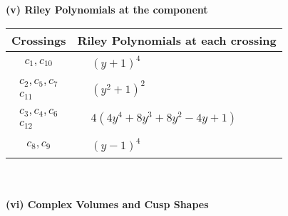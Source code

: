 \documentclass[1p]{elsarticle_modified}
\theoremstyle{definition}
\begin{document}
\newpage\renewcommand{\arraystretch}{1}
\flushleft \textbf{(v) Riley Polynomials at the component}\newline \\
\begin{tabular}{m{50pt}|m{274pt}}
Crossings & \hspace{64pt}Riley Polynomials at each crossing \\
\hline $$\begin{aligned}c_{1},c_{10}\end{aligned}$$&$\begin{aligned}
&(y+1)^4
\end{aligned}$\\
\hline $$\begin{aligned}c_{2},c_{5},c_{7}\\c_{11}\end{aligned}$$&$\begin{aligned}
&(y^2+1)^2
\end{aligned}$\\
\hline $$\begin{aligned}c_{3},c_{4},c_{6}\\c_{12}\end{aligned}$$&$\begin{aligned}
&4(4 y^4+8 y^3+8 y^2-4 y+1)
\end{aligned}$\\
\hline $$\begin{aligned}c_{8},c_{9}\end{aligned}$$&$\begin{aligned}
&(y-1)^4
\end{aligned}$\\
\hline
\end{tabular}\\~\\
\newpage\flushleft \textbf{(vi) Complex Volumes and Cusp Shapes}
\end{document}
